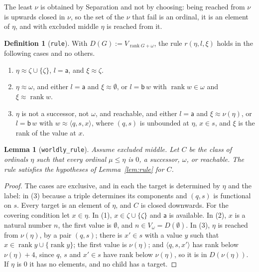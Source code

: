 \documentclass[10pt]{article}
\newtheorem{lemma}[theorem]{Lemma}
\theoremstyle{definition}
\newtheorem{definition}[theorem]{Definition}
\theoremstyle{remark}
\newcommand{\rk}{\operatorname{rank}}
\newcommand{\la}{\mathsf{a}}
\newcommand{\lb}{\mathsf{b}}
\newcommand{\lean}[1]{\texttt{#1}}
\begin{document}
The least $\nu$ is obtained by Separation and not by choosing: being
reached from $\nu$ is upwards closed in $\nu$, so the set of the $\nu$ that
fail is an ordinal, it is an element of $\eta$, and with excluded middle
$\eta$ is reached from it.

\begin{definition}[\lean{rule}]\label{def:rule}
With $D(G):=V_{\rk G+\omega}$, the rule $r(\eta,l,\xi)$ holds in the following
cases and no others.
\begin{enumerate}
\item $\eta\approx\zeta\cup\{\zeta\}$, $l=\la$, and $\xi\approx\zeta$.
\item $\eta\approx\omega$, and either $l=\la$ and $\xi\approx\emptyset$, or $l=\lb\,w$ with
  $\rk w\in\omega$ and $\xi\approx\rk w$.
\item $\eta$ is not a successor, not $\omega$, and reachable, and either
  $l=\la$ and $\xi\approx\nu(\eta)$, or $l=\lb\,w$ with $w\approx\langle q,s,x\rangle$, where
  $(q,s)$ is unbounded at $\eta$, $x\in s$, and $\xi$ is the rank of the value
  at $x$.
\end{enumerate}
\end{definition}

\begin{lemma}[\lean{worldly\_rule}]\label{lem:worldlyrule}
Assume excluded middle. Let $C$ be the class of ordinals $\eta$ such that
every ordinal $\mu\le\eta$ is $0$, a successor, $\omega$, or reachable. The rule
satisfies the hypotheses of Lemma~\ref{lem:rule} for $C$.
\end{lemma}
\begin{proof}
The cases are exclusive, and in each the target is determined by $\eta$
and the label: in (3) because a triple determines its components and
$(q,s)$ is functional on $s$. Every target is an element of $\eta$, and
$C$ is closed downwards. For the covering condition let $x\in\eta$. In (1),
$x\in\zeta\cup\{\zeta\}$ and $\la$ is available. In (2), $x$ is a natural number
$n$, the first value is $\emptyset$, and $n\in V_\omega=D(\emptyset)$. In (3),
$\eta$ is reached from $\nu(\eta)$, by a pair $(q,s)$; there is $x'\in s$ with a
value $y$ such that $x\in\rk y\cup\{\rk y\}$; the first value is $\nu(\eta)$; and
$\langle q,s,x'\rangle$ has rank below $\nu(\eta)+4$, since $q$, $s$ and $x'\in s$ have
rank below $\nu(\eta)$, so it is in $D(\nu(\eta))$. If $\eta$ is $0$ it has no
elements, and no child has a target.
\end{proof}
\end{document}
